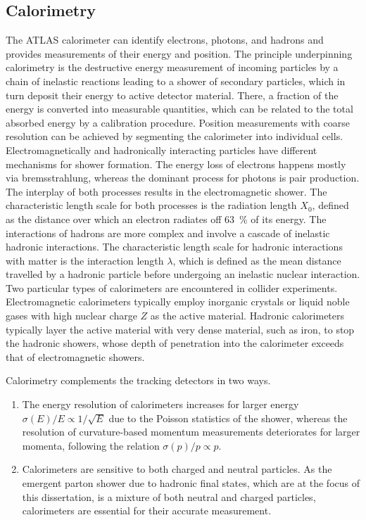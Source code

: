 \subsection{Calorimetry}
\label{sec:experiment:ATLAS:calorimetry}
The ATLAS calorimeter can identify electrons, photons, and hadrons and provides measurements of their energy and position.
The principle underpinning calorimetry is the destructive energy measurement of incoming particles by a chain of inelastic reactions leading to a shower of secondary particles, which in turn deposit their energy to active detector material. There, a fraction of the energy is converted into measurable quantities, which can be related to the total absorbed energy by a calibration procedure. Position measurements with coarse resolution can be achieved by segmenting the calorimeter into individual cells.
Electromagnetically and hadronically interacting particles have different mechanisms for shower formation. The energy loss of electrons happens mostly via bremsstrahlung, whereas the dominant process for photons is pair production. The interplay of both processes results in the electromagnetic shower. The characteristic length scale for both processes is the radiation length \(X_0\), defined as the distance over which an electron radiates off \SI{63}{\percent} of its energy.
The interactions of hadrons are more complex and involve a cascade of inelastic hadronic interactions. The characteristic length scale for hadronic interactions with matter is the interaction length \(\lambda\), which is defined as the mean distance travelled by a hadronic particle before undergoing an inelastic nuclear interaction.
Two particular types of calorimeters are encountered in collider experiments. Electromagnetic calorimeters typically employ inorganic crystals or liquid noble gases with high nuclear charge \(Z\) as the active material. Hadronic calorimeters typically layer the active material with very dense material, such as iron, to stop the hadronic showers, whose depth of penetration into the calorimeter exceeds that of electromagnetic showers.

Calorimetry complements the tracking detectors in two ways.
\begin{enumerate}
    \item The energy resolution of calorimeters increases for larger energy \(\sigma(E) / E \propto 1 / \sqrt{E}\) due to the Poisson statistics of the shower, whereas the resolution of curvature-based momentum measurements deteriorates for larger momenta, following the relation \(\sigma(p) / p \propto p\).
    \item Calorimeters are sensitive to both charged and neutral particles. As the emergent parton shower due to hadronic final states, which are at the focus of this dissertation, is a mixture of both neutral and charged particles, calorimeters are essential for their accurate measurement.
\end{enumerate}

